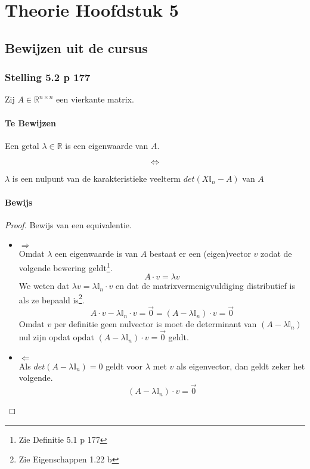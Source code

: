 \documentclass[lineaire_algebra_oplossingen.tex]{subfiles}
\begin{document}
\chapter{Theorie Hoofdstuk 5}
\section{Bewijzen uit de cursus}

\subsection{Stelling 5.2 p 177}
Zij $A\in \mathbb{R}^{n\times n}$ een vierkante matrix.
\subsubsection*{Te Bewijzen}
\begin{center}
Een getal $\lambda\in\mathbb{R}$ is een eigenwaarde van $A$.
\end{center}
\[\Leftrightarrow\]
\begin{center}
$\lambda$ is een nulpunt van de karakteristieke veelterm $det(X\mathbb{I}_n - A)$ van $A$
\end{center}
\subsubsection*{Bewijs}
\begin{proof}
Bewijs van een equivalentie.
\begin{itemize}
\item $\Rightarrow$\\
Omdat $\lambda$ een eigenwaarde is van $A$ bestaat er een (eigen)vector $v$ zodat de volgende bewering geldt\footnote{Zie Definitie 5.1 p 177}.
\[
A\cdot v = \lambda v
\]
We weten dat $\lambda v =  \lambda \mathbb{I}_n \cdot v$ en dat de matrixvermenigvuldiging distributief is als ze bepaald is\footnote{Zie Eigenschappen 1.22 b}.
\[
A\cdot v - \lambda \mathbb{I}_n \cdot v = \vec{0} = (A-\lambda\mathbb{I}_n)\cdot v = \vec{0}
\]
Omdat $v$ per definitie geen nulvector is moet de determinant van $(A-\lambda\mathbb{I}_n)$ nul zijn opdat opdat $(A-\lambda\mathbb{I}_n)\cdot v = \vec{0}$ geldt.

\item $\Leftarrow$\\
Als $det(A-\lambda\mathbb{I}_n) = 0$ geldt voor $\lambda$ met $v$ als eigenvector, dan geldt zeker het volgende.
\[
(A-\lambda\mathbb{I}_n)\cdot v = \vec{0}
\]
\end{itemize}
\end{proof}
\end{document}
